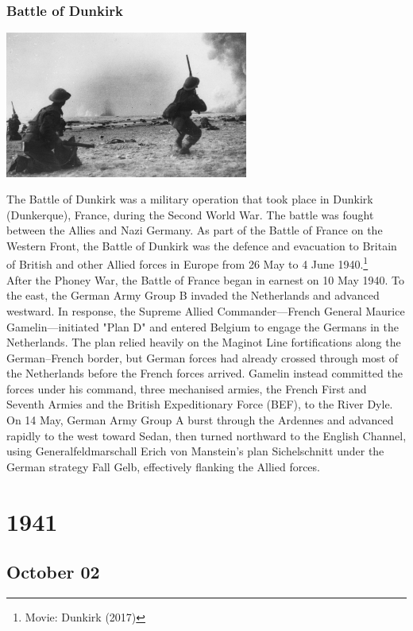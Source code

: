 \documentclass[11pt]{report}
\begin{document}
\subsection{Battle of Dunkirk}
\vspace{2mm}\begin{center}\includegraphics[width=8cm]{./img/dunkirk.jpg}\end{center}
The Battle of Dunkirk was a military operation that took place in Dunkirk (Dunkerque), France, during the Second World War. The battle was fought between the Allies and Nazi Germany. As part of the Battle of France on the Western Front, the Battle of Dunkirk was the defence and evacuation to Britain of British and other Allied forces in Europe from 26 May to 4 June 1940.\footnote{Movie: Dunkirk (2017)}\\
\indent After the Phoney War, the Battle of France began in earnest on 10 May 1940. To the east, the German Army Group B invaded the Netherlands and advanced westward. In response, the Supreme Allied Commander—French General Maurice Gamelin—initiated "Plan D" and entered Belgium to engage the Germans in the Netherlands. The plan relied heavily on the Maginot Line fortifications along the German–French border, but German forces had already crossed through most of the Netherlands before the French forces arrived. Gamelin instead committed the forces under his command, three mechanised armies, the French First and Seventh Armies and the British Expeditionary Force (BEF), to the River Dyle. On 14 May, German Army Group A burst through the Ardennes and advanced rapidly to the west toward Sedan, then turned northward to the English Channel, using Generalfeldmarschall Erich von Manstein's plan Sichelschnitt under the German strategy Fall Gelb, effectively flanking the Allied forces.

\chapter{1941}
\section{October 02}
\end{document}

